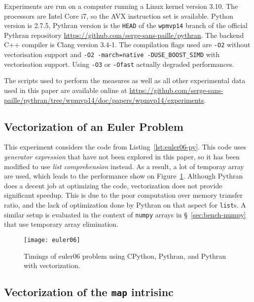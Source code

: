 \documentclass[preprint]{sigplanconf}
\begin{document}
Experiments are run on a computer running a Linux kernel version 3.10. The
processors are Intel Core i7, so the AVX instruction set is available. Python
version is 2.7.5, Pythran version is the \texttt{HEAD} of the \texttt{wpmvp14}
branch of the official Pythran repository
\url{https://github.com/serge-sans-paille/pythran}. The backend C++ compiler is
Clang version 3.4-1. The compilation flags used are \texttt{-O2} without
vectorisation support and \texttt{-O2 -march=native -DUSE\_BOOST\_SIMD} with
vectorisation support. Using \texttt{-O3} or \texttt{-Ofast} actually degraded
performances.

The scripts used to perform the measures as well as all other experimental data
used in this paper are available online at
\url{https://github.com/serge-sans-paille/pythran/tree/wpmvp14/doc/papers/wpmvp14/experiments}.



\subsection{Vectorization of an Euler Problem}

This experiment considers the code from Listing~\ref{lst:euler06-py}. This code
uses \emph{generator expression} that have not been explored in this paper, so
it has been modified to use \emph{list comprehension} instead. As a result, a
lot of temporay array are used, which leads to the performance show on
Figure~\ref{fig:euler06-timings}. Although Pythran does a decent job at
optimizing the code, vectorization does not provide significant speedup. This
is due to the poor computation over memory transfer ratio, and the lack of
optimization done by Pythran on that aspect for \texttt{list}s. A similar setup
is evaluated in the context of \texttt{numpy} arrays in
\S~\ref{sec:bench-numpy} that use temporary array elimination.

\begin{figure}[ht]

    \texttt{[image: euler06]}
    \caption{Timings of euler06 problem using CPython, Pythran, and Pythran with vectorization.}
    \label{fig:euler06-timings}

\end{figure}

\subsection{Vectorization of the \texttt{map} intrisinc}
\end{document}
